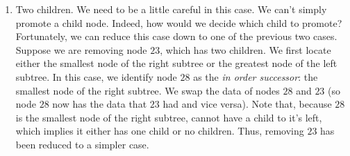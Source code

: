 \begin{enumerate}
\begin{minipage}{0.3\textwidth}
\end{minipage}
\begin{minipage}{0.2\textwidth}
   \begin{center}
   \end{center}
\end{minipage}
\begin{minipage}{0.3\textwidth}
\end{minipage}

\item Two children.
We need to be a little careful in this case.
We can't simply promote a child node.
Indeed, how would we decide which child to promote?
Fortunately, we can reduce this case down to one of the previous two cases.
Suppose we are removing node $23$, which has two children.
We first locate either the smallest node of the right subtree or the greatest node of the left subtree.
In this case, we identify node $28$ as the \emph{in order successor}: the smallest node of the right subtree.
We swap the data of nodes $28$ and $23$ (so node $28$ now has the data that $23$ had and vice versa).
Note that, because $28$ is the smallest node of the right subtree, cannot have a child to it's left, which implies it either has one child or no children.
Thus, removing $23$ has been reduced to a simpler case.


\end{enumerate}
